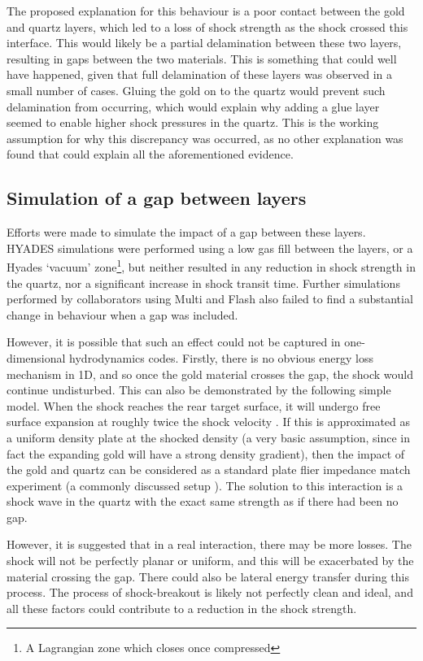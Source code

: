 The proposed explanation for this behaviour is a poor contact between the gold and quartz layers, which led to a loss of shock strength as the shock crossed this interface. This would likely be a partial delamination between these two layers, resulting in gaps between the two materials. This is something that could well have happened, given that full delamination of these layers was observed in a small number of cases. Gluing the gold on to the quartz would prevent such delamination from occurring, which would explain why adding a glue layer seemed to enable higher shock pressures in the quartz. This is the working assumption for why this discrepancy was occurred, as no other explanation was found that could explain all the aforementioned evidence.


\subsection{Simulation of a gap between layers}

Efforts were made to simulate the impact of a gap between these layers. HYADES simulations were performed using a low gas fill between the layers, or a Hyades `vacuum' zone\footnote{A Lagrangian zone which closes once compressed}, but neither resulted in any reduction in shock strength in the quartz, nor a significant increase in shock transit time. Further simulations performed by collaborators using Multi and Flash also failed to find a substantial change in behaviour when a gap was included.

However, it is possible that such an effect could not be captured in one-dimensional hydrodynamics codes. Firstly, there is no obvious energy loss mechanism in 1D, and so once the gold material crosses the gap, the shock would continue undisturbed. This can also be demonstrated by the following simple model. When the shock reaches the rear target surface, it will undergo free surface expansion at roughly twice the shock velocity \cite{Forbes2012}. If this is approximated as a uniform density plate at the shocked density (a very basic assumption, since in fact the expanding gold will have a strong density gradient), then the impact of the gold and quartz can be considered as a standard plate flier impedance match experiment (a commonly discussed setup \cite{Forbes2012}). The solution to this interaction is a shock wave in the quartz with the exact same strength as if there had been no gap.

However, it is suggested that in a real interaction, there may be more losses. The shock will not be perfectly planar or uniform, and this will be exacerbated by the material crossing the gap. There could also be lateral energy transfer during this process. The process of shock-breakout is likely not perfectly clean and ideal, and all these factors could contribute to a reduction in the shock strength.


